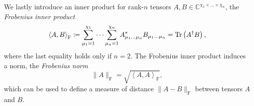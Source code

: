 We lastly introduce an inner product for rank-$n$ tensors $A, B \in \mathbb{C}^{\chi_1\times\dots\times\chi_n}$, the \textit{Frobenius inner product}
\begin{equation}
	\label{eq:frobenius_inner_product}
	\left\langle A, B\right\rangle_\text{F} \coloneqq \sum_{\mu_1=1}^{\chi_1} \dots \sum_{\mu_n=1}^{\chi_n} A_{\mu_1\dots\mu_n}^*B_{\mu_1\dots\mu_n} = \operatorname{Tr}\left(A^\dagger B\right),
\end{equation}
where the last equality holds only if $n = 2$. The Frobenius inner product induces a norm, the \textit{Frobenius norm}
\begin{equation}
	\label{eq:frobenius_norm}
	\lVert A\rVert_\text{F} = \sqrt{\left\langle A, A\right\rangle_\text{F}},
\end{equation}
which can be used to define a measure of distance $\lVert A-B\rVert_\text{F}$ between tensors $A$ and $B$.